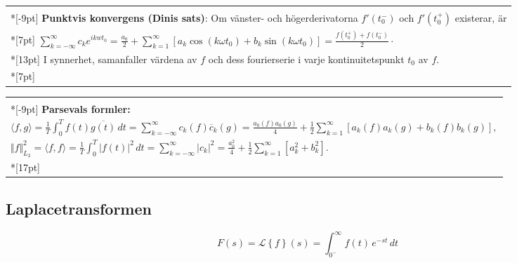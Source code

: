 \documentclass{article}
\newcommand\conj[1]{{\overline #1}}
\let\ob\conj
\def\SP#1{\langle #1\rangle}
\def\Laplace#1{\mathcal L\left\{#1\right\}}
\let\LL\Laplace
\begin{document}
\medskip
\begin{tabular}[t]{|l|}
  \hline
   \\*[-9pt]
   \textbf{Punktvis konvergens (Dinis sats)}: Om vänster- och högerderivatorna
   $f'(t_0^-)$ och $f'(t_0^+)$ existerar, är\\*[7pt]
   \hfil $
    \sum_{k=-\infty}^\infty c_k e^{ikwt_0}
    =\frac{a_0}2 + \sum_{k=1}^\infty [a_k\cos(k\omega t_0) + b_k\sin(k\omega t_0)] 
    = \frac{f(t_0^+)+f(t_0^-)}{2}\cdot
    $
    \\*[13pt]
  I synnerhet, samanfaller värdena av $f$ och dess fourierserie i 
  varje kontinuitetspunkt $t_0$ av $f$.
  \\*[7pt] 
  \hline
\end{tabular}%

\medskip
\begin{tabular}[t]{|l|}
  \hline
   \\*[-9pt]
\textbf{Parsevals formler:}
\\
$
\SP{f,g}
= \frac1T\int_0^T f(t)\overline{g(t)}\,dt
= \sum_{k=-\infty}^\infty c_k(f)\ob c_k(g)
= \frac{a_0(f)a_0(g)}4 
 + \frac12\sum_{k=1}^\infty [a_k(f)a_k(g)+b_k(f)b_k(g)],
$
\\
$
\Vert f\Vert_{L_2}^2
=\SP{f,f}
= \frac1T\int_0^T |f(t)|^2\,dt
= \sum_{k=-\infty}^\infty |c_k|^2
= \frac{a_0^2}4 
 + \frac12\sum_{k=1}^\infty [a_k^2+b_k^2].
$
\\*[17pt]
  \hline
\end{tabular}%

\subsection*{Laplacetransformen}%

$$
F(s) = \LL{f}(s) = \int_{0^-}^\infty f(t)\,e^{-st}\,dt
$$
\end{document}
